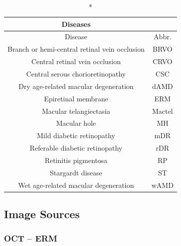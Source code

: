 \documentclass{article}
\begin{document}
	{
		\fontsize{9}{12}\selectfont
		{
			\begin{longtable}{cc}
				\caption*{Diseases}
				\label{tb:diseases}\\
				\toprule
				Disease&Abbr.\\
				\toprule
				
				Branch or hemi-central retinal vein occlusion&BRVO\\
				Central retinal vein occlusion&CRVO\\
				Central serous chorioretinopathy&CSC\\
				Dry age-related macular degeneration&dAMD\\
				Epiretinal membrane&ERM\\
				Macular telangiectasia&Mactel\\
				Macular hole&MH\\
				Mild diabetic retinopathy&mDR\\
				Referable diabetic retinopathy&rDR\\
				Retinitis pigmentosa&RP\\
				Stargardt disease&ST\\
				Wet age-related macular degeneration&wAMD\\
				\bottomrule
			\end{longtable}
		}
	}
	
	\subsection*{Image Sources}
	
	\subsubsection*{OCT -- ERM}
	\vspace{0.5cm}
	
\end{document}
